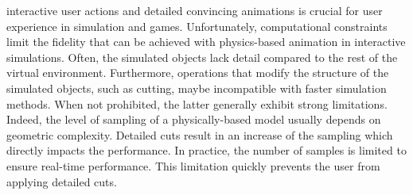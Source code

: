 

 interactive user actions and detailed convincing animations is crucial for user experience in simulation and games. Unfortunately, computational constraints limit the 
fidelity that can be achieved with physics-based animation
in interactive simulations. Often, the simulated objects lack detail compared to the rest of the virtual environment.
Furthermore, operations that modify the structure of the simulated objects, such as cutting, 
maybe incompatible with faster simulation methods.
When not prohibited, the latter generally exhibit strong limitations. Indeed, the level of sampling of a physically-based model usually depends on geometric complexity. Detailed cuts result in an increase of the sampling which directly impacts the performance. In practice, the number of samples is limited to ensure real-time performance. This limitation quickly prevents the user from applying detailed cuts.  
\\ \\
